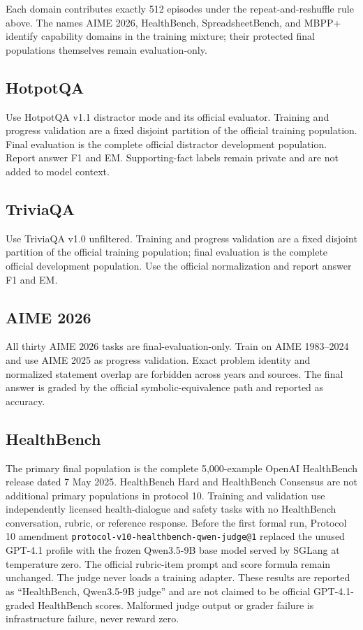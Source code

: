 \documentclass[11pt]{article}
\begin{document}
Each domain contributes exactly 512 episodes under the repeat-and-reshuffle rule
above.  The names AIME 2026, HealthBench, SpreadsheetBench, and MBPP+ identify
capability domains in the training mixture; their protected final populations
themselves remain evaluation-only.

\subsection{HotpotQA}

Use HotpotQA v1.1 distractor mode and its official evaluator.  Training and
progress validation are a fixed disjoint partition of the official training
population.  Final evaluation is the complete official distractor development
population.  Report answer F1 and EM.  Supporting-fact labels remain private
and are not added to model context.

\subsection{TriviaQA}

Use TriviaQA v1.0 unfiltered.  Training and progress validation are a fixed
disjoint partition of the official training population; final evaluation is
the complete official development population.  Use the official normalization
and report answer F1 and EM.

\subsection{AIME 2026}

All thirty AIME 2026 tasks are final-evaluation-only.  Train on AIME
1983--2024 and use AIME 2025 as progress validation.  Exact problem identity
and normalized statement overlap are forbidden across years and sources.
The final answer is graded by the official symbolic-equivalence path and
reported as accuracy.

\subsection{HealthBench}

The primary final population is the complete 5,000-example OpenAI HealthBench
release dated 7 May 2025.  HealthBench Hard and HealthBench Consensus are not
additional primary populations in protocol 10.  Training and validation use
independently licensed health-dialogue and safety tasks with no HealthBench
conversation, rubric, or reference response.  Before the first formal run,
Protocol 10 amendment \texttt{protocol-v10-healthbench-qwen-judge@1} replaced
the unused GPT-4.1 profile with the frozen Qwen3.5-9B base model served by
SGLang at temperature zero.  The official rubric-item prompt and score formula
remain unchanged.  The judge never loads a training adapter.  These results
are reported as ``HealthBench, Qwen3.5-9B judge'' and are not claimed to be
official GPT-4.1-graded HealthBench scores.  Malformed judge output or grader
failure is infrastructure failure, never reward zero.
\end{document}
